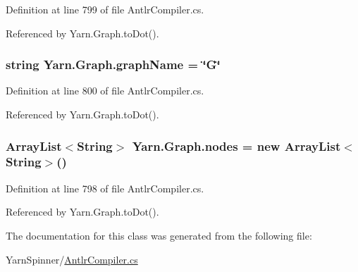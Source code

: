 Definition at line 799 of file Antlr\-Compiler.\-cs.



Referenced by Yarn.\-Graph.\-to\-Dot().

\hypertarget{a00102_a8605f1ec5a4e9cfd07d3ac2be042dac6}{
\subsubsection[{graph\-Name}]{\setlength{\rightskip}{0pt plus 5cm}string Yarn.\-Graph.\-graph\-Name = \char`\"{}G\char`\"{}}}\label{a00102_a8605f1ec5a4e9cfd07d3ac2be042dac6}


Definition at line 800 of file Antlr\-Compiler.\-cs.



Referenced by Yarn.\-Graph.\-to\-Dot().

\hypertarget{a00102_a506df6f737a41748c01239bdea5d82b1}{
\subsubsection[{nodes}]{\setlength{\rightskip}{0pt plus 5cm}Array\-List$<${\bf String}$>$ Yarn.\-Graph.\-nodes = new Array\-List$<${\bf String}$>$()}}\label{a00102_a506df6f737a41748c01239bdea5d82b1}


Definition at line 798 of file Antlr\-Compiler.\-cs.



Referenced by Yarn.\-Graph.\-to\-Dot().



The documentation for this class was generated from the following file\-:\begin{DoxyCompactItemize}
\item 
Yarn\-Spinner/\hyperlink{a00294}{Antlr\-Compiler.\-cs}\end{DoxyCompactItemize}

